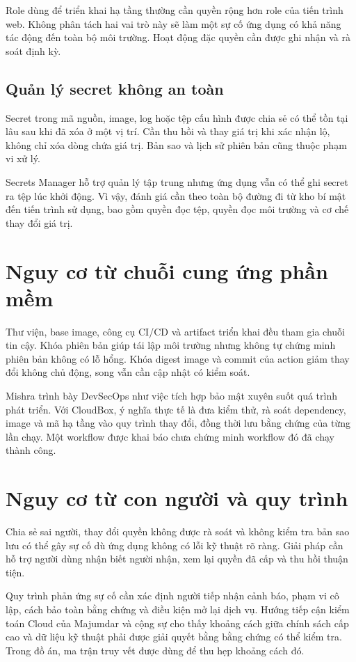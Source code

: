 Role dùng để triển khai hạ tầng thường cần quyền rộng hơn role của tiến trình web. Không phân tách hai vai trò này sẽ làm một sự cố ứng dụng có khả năng tác động đến toàn bộ môi trường. Hoạt động đặc quyền cần được ghi nhận và rà soát định kỳ.
\subsection{Quản lý secret không an toàn}
Secret trong mã nguồn, image, log hoặc tệp cấu hình được chia sẻ có thể tồn tại lâu sau khi đã xóa ở một vị trí. Cần thu hồi và thay giá trị khi xác nhận lộ, không chỉ xóa dòng chứa giá trị. Bản sao và lịch sử phiên bản cũng thuộc phạm vi xử lý.

Secrets Manager hỗ trợ quản lý tập trung nhưng ứng dụng vẫn có thể ghi secret ra tệp lúc khởi động. Vì vậy, đánh giá cần theo toàn bộ đường đi từ kho bí mật đến tiến trình sử dụng, bao gồm quyền đọc tệp, quyền đọc môi trường và cơ chế thay đổi giá trị.

\section{Nguy cơ từ chuỗi cung ứng phần mềm}
Thư viện, base image, công cụ CI/CD và artifact triển khai đều tham gia chuỗi tin cậy. Khóa phiên bản giúp tái lập môi trường nhưng không tự chứng minh phiên bản không có lỗ hổng. Khóa digest image và commit của action giảm thay đổi không chủ động, song vẫn cần cập nhật có kiểm soát.

Mishra trình bày DevSecOps như việc tích hợp bảo mật xuyên suốt quá trình phát triển. Với CloudBox, ý nghĩa thực tế là đưa kiểm thử, rà soát dependency, image và mã hạ tầng vào quy trình thay đổi, đồng thời lưu bằng chứng của từng lần chạy. Một workflow được khai báo chưa chứng minh workflow đó đã chạy thành công.\cite{mishra}

\section{Nguy cơ từ con người và quy trình}
Chia sẻ sai người, thay đổi quyền không được rà soát và không kiểm tra bản sao lưu có thể gây sự cố dù ứng dụng không có lỗi kỹ thuật rõ ràng. Giải pháp cần hỗ trợ người dùng nhận biết người nhận, xem lại quyền đã cấp và thu hồi thuận tiện.

Quy trình phản ứng sự cố cần xác định người tiếp nhận cảnh báo, phạm vi cô lập, cách bảo toàn bằng chứng và điều kiện mở lại dịch vụ. Hướng tiếp cận kiểm toán Cloud của Majumdar và cộng sự cho thấy khoảng cách giữa chính sách cấp cao và dữ liệu kỹ thuật phải được giải quyết bằng bằng chứng có thể kiểm tra. Trong đồ án, ma trận truy vết được dùng để thu hẹp khoảng cách đó.\cite{auditing}

